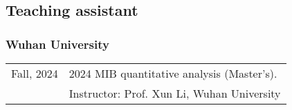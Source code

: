\subsection*{Teaching assistant}
\subsubsection*{Wuhan University}
% 
\begin{longtable}[l]{@{}p{} p{}}

    Fall, 2024 & 2024 MIB quantitative analysis (Master’s). \\
    
   & Instructor: Prof. Xun Li, Wuhan University  \\
    

\end{longtable}
